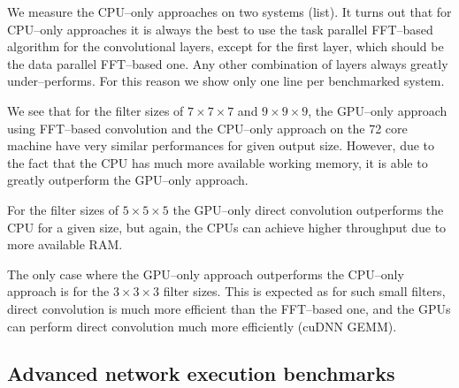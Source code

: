 \documentclass[conference]{IEEEtran}
\begin{document}
  We measure the CPU--only approaches on two systems (list).  It turns
  out that for CPU--only approaches it is always the best to use the
  task parallel FFT--based algorithm for the convolutional layers,
  except for the first layer, which should be the data parallel
  FFT--based one.  Any other combination of layers always greatly
  under--performs.  For this reason we show only one line per
  benchmarked system.

  We see that for the filter sizes of $7 \times 7 \times 7$ and $9
  \times 9 \times 9$, the GPU--only approach using FFT--based
  convolution and the CPU--only approach on the 72 core machine have
  very similar performances for given output size.  However, due to
  the fact that the CPU has much more available working memory, it is
  able to greatly outperform the GPU--only approach.

  For the filter sizes of $5 \times 5 \times 5$ the GPU--only direct
  convolution outperforms the CPU for a given size, but again, the
  CPUs can achieve higher throughput due to more available RAM.

  The only case where the GPU--only approach outperforms the CPU--only
  approach is for the $3 \times 3 \times 3$ filter sizes.  This is
  expected as for such small filters, direct convolution is much more
  efficient than the FFT--based one, and the GPUs can perform direct
  convolution much more efficiently (cuDNN GEMM).


\subsection{Advanced network execution benchmarks}
\end{document}
